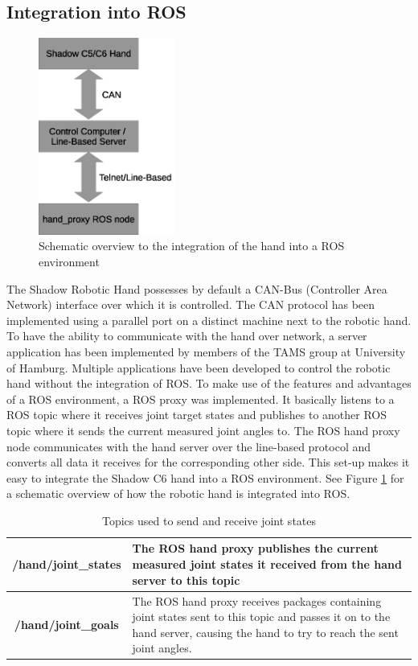 \subsection{Integration into ROS}

\begin{figure}
	\caption{\label{fig:hand:ros_integration}Schematic overview to the integration of the hand into a ROS environment}
	\includegraphics[width=0.4\textwidth]{assets/chpt_basics/hand/ros_integration.eps}
\end{figure}

The Shadow Robotic Hand possesses by default a CAN-Bus (Controller Area Network) interface over which it is controlled\cite{web:robothand:spec}. The CAN protocol has been implemented using a parallel port on a distinct machine next to the robotic hand. To have the ability to communicate with the hand over network, a server application has been implemented by members of the TAMS group at University of Hamburg. 
Multiple applications have been developed to control the robotic hand without the integration of ROS. To make use of the features and advantages of a ROS environment, a ROS proxy was implemented. It basically listens to a ROS topic where it receives joint target states and publishes to another ROS topic where it sends the current measured joint angles to. The ROS hand proxy node communicates with the hand server over the line-based protocol and converts all data it receives for the corresponding other side. This set-up makes it easy to integrate the Shadow C6 hand into a ROS environment. See Figure \ref{fig:hand:ros_integration} for a schematic overview of how the robotic hand is integrated into ROS.

\begin{table}
	\caption{\label{tab:rosmsg:topics}Topics used to send and receive joint states}
	\begin{tabularx}{\linewidth}{|c|X|}
		\hline
		\textbf{/hand/joint\_states} & The ROS hand proxy publishes the current measured joint states it received from the hand server to this topic \\
		\hline
		\textbf{/hand/joint\_goals} & The ROS hand proxy receives packages containing joint states sent to this topic and passes it on to the hand server, causing the hand to try to reach the sent joint angles. \\
		\hline
	\end{tabularx}
\end{table}

